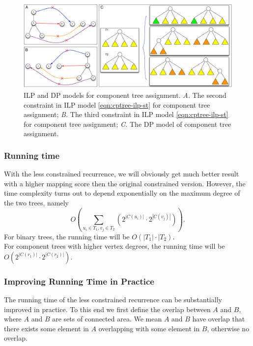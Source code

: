 \begin{figure}[htbp]
\centering
\includegraphics[width=1.0\textwidth]{images/treeassign_cptree}
\caption[ILP and DP models for component tree assignment]{ILP and DP models for component tree assignment. \emph{A.} The second constraint in ILP model \ref{eqn:cptree-ilp-st} for component tree assignment; \emph{B.} The third constraint in ILP model \ref{eqn:cptree-ilp-st} for component tree assignment; \emph{C.} The DP model of component tree assignment.}
\label{fig:treeassign-cptree}
\end{figure}

\subsubsection{Running time}
With the less constrained recurrence, we will obviously get much better result with a higher mapping score then the original constrained version. However, the time complexity turns out to depend exponentially on the maximum degree of the two trees, namely
\begin{equation} \label{eqn:lcdp-time}
O\left(\sum_{u_i \in T_1, v_j \in T_2}(2^{|C(u_i)|}\cdot 2^{|C(v_j)|})\right).
\end{equation}
For binary trees, the running time will be
$O(|T_1|\cdot|T_2)$.\\ 
For component trees with higher vertex degrees, the running time will be 
$O\left(2^{|C(r_1)|}\cdot2^{|C(r_2)|}\right)$.
 
\subsubsection{Improving Running Time in Practice}
The running time of the less constrained recurrence can be substantially improved in practice. To this end we first define the overlap between $A$ and $B$, where $A$ and $B$ are sets of connected area. We mean $A$ and $B$ have overlap that there exists some element in $A$ overlapping with some element in $B$, otherwise no overlap.

